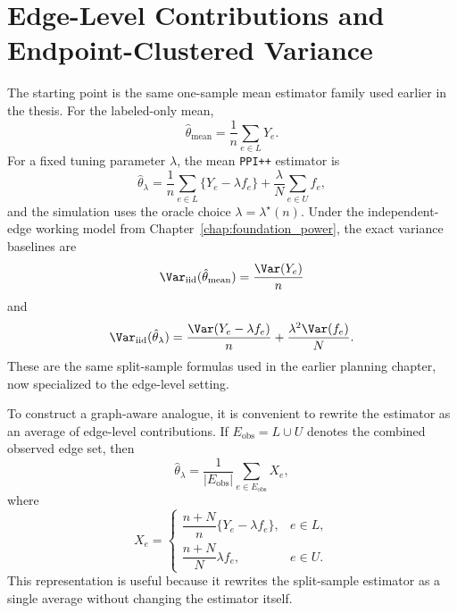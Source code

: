 \section{Edge-Level Contributions and Endpoint-Clustered Variance}

The starting point is the same one-sample mean estimator family used earlier in the thesis. For the labeled-only mean,
\[
\hat\theta_{\mathrm{mean}}
=
\frac{1}{n}\sum_{e \in L} Y_e.
\]
For a fixed tuning parameter \(\lambda\), the mean \texttt{PPI++} estimator is
\[
\hat\theta_{\lambda}
=
\frac{1}{n}\sum_{e \in L}\{Y_e-\lambda f_e\}
+
\frac{\lambda}{N}\sum_{e \in U} f_e,
\]
and the simulation uses the oracle choice \(\lambda=\lambda^\star(n)\). Under the independent-edge working model from Chapter~\ref{chap:foundation_power}, the exact variance baselines are
\[
\Var_{\mathrm{iid}}(\hat\theta_{\mathrm{mean}})
=
\frac{\Var(Y_e)}{n}
\]
and
\[
\Var_{\mathrm{iid}}(\hat\theta_{\lambda})
=
\frac{\Var(Y_e-\lambda f_e)}{n}
+
\frac{\lambda^2 \Var(f_e)}{N}.
\]
These are the same split-sample formulas used in the earlier planning chapter, now specialized to the edge-level setting.

To construct a graph-aware analogue, it is convenient to rewrite the estimator as an average of edge-level contributions. If \(E_{\mathrm{obs}}=L\cup U\) denotes the combined observed edge set, then
\[
\hat\theta_{\lambda} = \frac{1}{|E_{\mathrm{obs}}|}\sum_{e\in E_{\mathrm{obs}}} X_e,
\]
where
\[
X_e =
\begin{cases}
\dfrac{n+N}{n}\{Y_e-\lambda f_e\}, & e \in L,\\[6pt]
\dfrac{n+N}{N}\lambda f_e, & e \in U.
\end{cases}
\]
This representation is useful because it rewrites the split-sample estimator as a single average without changing the estimator itself.

